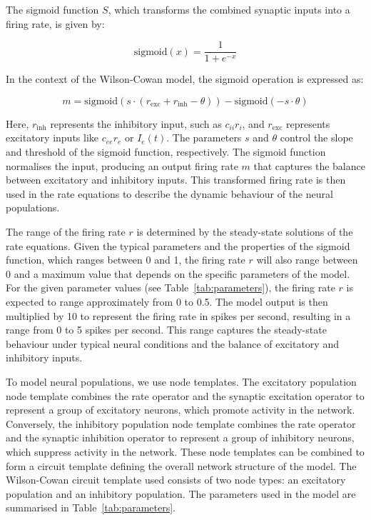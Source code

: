 \documentclass[12pt]{article}
\begin{document}
The sigmoid function \( S \), which transforms the combined synaptic inputs into a firing rate, is given by:

\[
\text{sigmoid}(x) = \frac{1}{1 + e^{-x}}
\]

In the context of the Wilson-Cowan model, the sigmoid operation is expressed as:

\[
m = \text{sigmoid}(s \cdot (r_{\text{exc}} + r_{\text{inh}} - \theta)) - \text{sigmoid}(-s \cdot \theta)
\]

Here, \( r_{\text{inh}} \) represents the inhibitory input, such as \( c_{ii} r_i \), and \( r_{\text{exc}} \) represents excitatory inputs like \( c_{ee} r_e \) or \( I_e(t) \). The parameters \( s \) and \( \theta \) control the slope and threshold of the sigmoid function, respectively. The sigmoid function normalises the input, producing an output firing rate \( m \) that captures the balance between excitatory and inhibitory inputs. This transformed firing rate is then used in the rate equations to describe the dynamic behaviour of the neural populations.

The range of the firing rate \( r \) is determined by the steady-state solutions of the rate equations. Given the typical parameters and the properties of the sigmoid function, which ranges between 0 and 1, the firing rate \( r \) will also range between 0 and a maximum value that depends on the specific parameters of the model. For the given parameter values (see Table~\ref{tab:parameters}), the firing rate \( r \) is expected to range approximately from 0 to 0.5. The model output is then multiplied by 10 to represent the firing rate in spikes per second, resulting in a range from 0 to 5 spikes per second. This range captures the steady-state behaviour under typical neural conditions and the balance of excitatory and inhibitory inputs.

To model neural populations, we use node templates. The excitatory population node template combines the rate operator and the synaptic excitation operator to represent a group of excitatory neurons, which promote activity in the network. Conversely, the inhibitory population node template combines the rate operator and the synaptic inhibition operator to represent a group of inhibitory neurons, which suppress activity in the network. These node templates can be combined to form a circuit template defining the overall network structure of the model. The Wilson-Cowan circuit template used consists of two node types: an excitatory population and an inhibitory population. The parameters used in the model are summarised in Table~\ref{tab:parameters}.
\end{document}
